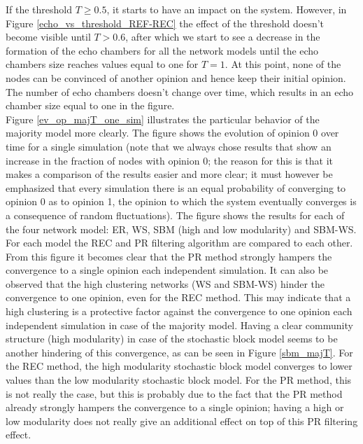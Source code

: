\documentclass[11 pt , letterpaper , twoside , openright]{book}
\begin{document}
If the threshold $T \geqslant 0.5$, it starts to have an impact on the system. However, in Figure \ref{echo_vs_threshold_REF-REC} the effect of the threshold doesn't become visible until $T > 0.6$, after which we start to see a decrease in the formation of the echo chambers for all the network models until the echo chambers size reaches values equal to one for $T=1$. At this point, none of the nodes can be convinced of another opinion and hence keep their initial opinion. The number of echo chambers doesn't change over time, which results in an echo chamber size equal to one in the figure.\\
\newline
Figure \ref{ev_op_majT_one_sim} illustrates the particular behavior of the majority model more clearly. The figure shows the evolution of opinion 0 over time for a single simulation (note that we always chose results that show an increase in the fraction of nodes with opinion 0; the reason for this is that it makes a comparison of the results easier and more clear; it must however be emphasized that every simulation there is an equal probability of converging to opinion 0 as to opinion 1, the opinion to which the system eventually converges is a consequence of random fluctuations). The figure shows the results for each of the four network model: ER, WS, SBM (high and low modularity) and SBM-WS. For each model the REC and PR filtering algorithm are compared to each other.\\
From this figure it becomes clear that the PR method strongly hampers the convergence to a single opinion each independent simulation. It can also be observed that the high clustering networks (WS and SBM-WS) hinder the convergence to one opinion, even for the REC method. This may indicate that a high clustering is a protective factor against the convergence to one opinion each independent simulation in case of the majority model. Having a clear community structure (high modularity) in case of the stochastic block model seems to be another hindering of this convergence, as can be seen in Figure \ref{sbm_majT}.  For the REC method, the high modularity stochastic block model converges to lower values than the low modularity stochastic block model. For the PR method, this is not really the case, but this is probably due to the fact that the PR method already strongly hampers the convergence to a single opinion; having a high or low modularity does not really give an additional effect on top of this PR filtering effect.
\end{document}
